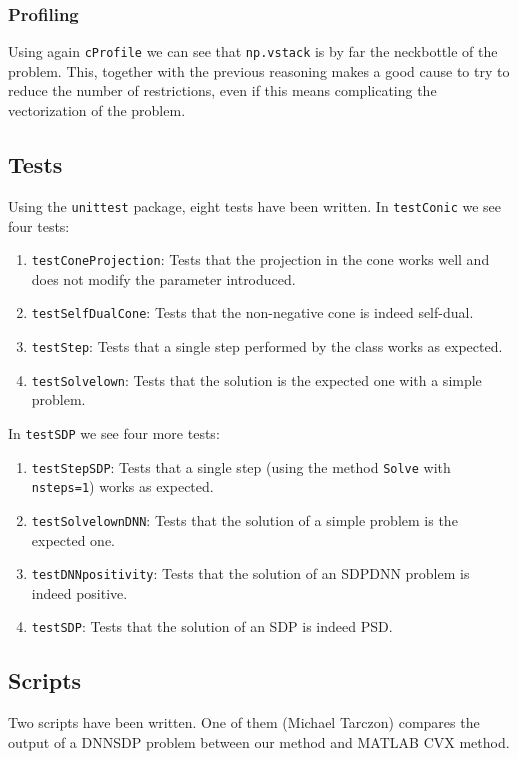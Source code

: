 \documentclass[paper=a4, fontsize=11pt]{scrartcl}
\numberwithin{equation}{section}		%
\numberwithin{figure}{section}			%
\numberwithin{table}{section}				%
\begin{document}
\subsubsection{Profiling}

Using again \texttt{cProfile} we can see that \texttt{np.vstack} is by far the neckbottle of the problem. This, together with the previous reasoning makes a good cause to try to reduce the number of restrictions, even if this means complicating the vectorization of the problem.

\subsection{Tests}

Using the \texttt{unittest} package, eight tests have been written.
In \texttt{testConic} we see four tests:
\begin{enumerate}
\item \texttt{testConeProjection}: Tests that the projection in the cone works well and does not modify the parameter introduced.
\item \texttt{testSelfDualCone}: Tests that the non-negative cone is indeed self-dual.
\item \texttt{testStep}: Tests that a single step performed by the class works as expected.
\item \texttt{testSolvelown}: Tests that the solution is the expected one with a simple problem.
\end{enumerate}
In \texttt{testSDP} we see four more tests:
\begin{enumerate}
\item \texttt{testStepSDP}: Tests that a single step (using the method \texttt{Solve} with \texttt{nsteps=1}) works as expected.
\item \texttt{testSolvelownDNN}: Tests that the solution of a simple problem is the expected one.
\item \texttt{testDNNpositivity}: Tests that the solution of an SDPDNN problem is indeed positive.
\item \texttt{testSDP}: Tests that the solution of an SDP is indeed PSD.
\end{enumerate}

\subsection{Scripts}
Two scripts have been written. One of them (Michael Tarczon) compares the output of a DNNSDP problem between our method and MATLAB CVX method. 
\end{document}
